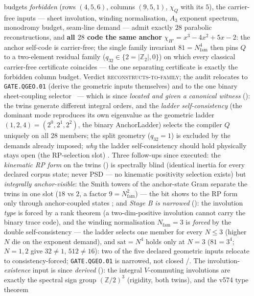 \documentclass[11pt,a4paper]{article}
\newcommand{\Nfam}{N_{\mathrm{fam}}}
\newcommand{\Z}{\mathbb{Z}}
\theoremstyle{definition}
\begin{document}
\begin{keybox}
budgets \emph{forbidden} (rows $(4,5,6)$, columns $(9,5,1)$, $\chi_Q$
with its $5$), the carrier-free inputs --- sheet involution, winding
normalisation, $A_3$ exponent spectrum, monodromy budget, seam-line
demand --- admit exactly $28$ parabolic reconstructions, and \textbf{all
$28$ code the same anchor} $\chi_{H'}=x^3-4x^2+5x-2$: the anchor
self-code is carrier-free; the single family invariant $81=\Nfam^4$ then
pins $Q$ to a two-element residual family ($q_{32}\in\{2{=}|\Z_2|,0\}$)
on which every classical carrier-free certificate coincides --- the one
separating certificate is exactly the forbidden column budget.  Verdict
\textsc{reconstructs-to-family}; the audit relocates to
\texttt{GATE.QGEO.01} (derive the geometric inputs themselves) and to
the one binary sheet-coupling selector \mO\ --- which is since
\emph{located and given a canonical witness}
(): the twins generate different
integral orders, and the \emph{ladder self-consistency} (the dominant
mode reproduces its own eigenvalue as the geometric ladder
$(1,2,4)=(2^0,2^1,2^2)$, the binary AnchorLadder) selects the compiler
$Q$ uniquely on all $28$ members; the split geometry ($q_{32}=1$) is
excluded by the demands already imposed; \emph{why} the ladder
self-consistency should hold physically stays open (the RP-selection
slot) \mO.  Three follow-ups since executed: the \emph{kinematic RP form}
on the twins () is spectrally blind
(identical inertia for every declared corpus state; never PSD --- no
kinematic positivity selection exists) but \emph{integrally
anchor-visible}: the Smith towers of the anchor-state Gram separate the
twins in one slot ($18$ vs $2$, a factor $9=\Nfam^2$) --- the bit shows
to the RP form only through anchor-coupled states \mE; and \emph{Stage B
is narrowed} (): the involution
\emph{type} is forced by a rank theorem (a two-dim-positive involution
cannot carry the binary trace code), and the winding normalisation
$\Nfam=3$ is \emph{forced} by the double self-consistency --- the ladder
selects one member for every $N\le3$ (higher $N$ die on the exponent
demand), and $\mathrm{sat}=N^4$ holds only at $N=3$ ($81=3^4$; $N=1,2$
give $32\neq1$, $512\neq16$): two of the five declared geometric inputs
relocate to consistency-forced; \texttt{GATE.QGEO.01} is narrowed, not
closed \mE/\mC.  The involution-\emph{existence} input is since
\emph{derived} (): the integral
$V$-commuting involutions are exactly the spectral sign group
$(\mathbb{Z}/2)^3$ (rigidity, both twins), and the v574 type theorem

\end{keybox}
\end{document}
